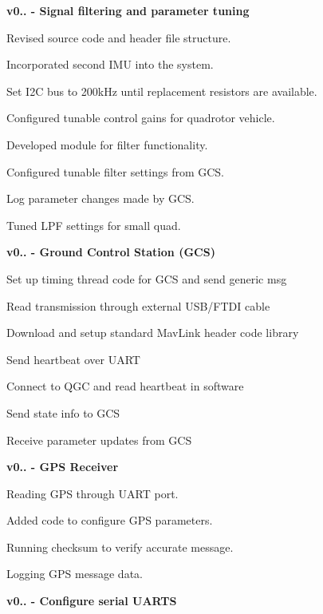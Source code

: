 \begin{DoxyItemize}
\begin{DoxyItemize}
\end{DoxyItemize}
\item {\bfseries  v0.. -\/ Signal filtering and parameter tuning } 
\begin{DoxyItemize}
\item Revised source code and header file structure.  
\item Incorporated second I\+MU into the system.  
\item Set I2C bus to 200k\+Hz until replacement resistors are available.  
\item Configured tunable control gains for quadrotor vehicle.  
\item Developed module for filter functionality.  
\item Configured tunable filter settings from G\+CS.  
\item Log parameter changes made by G\+CS.  
\item Tuned L\+PF settings for small quad.  
\end{DoxyItemize}
\item {\bfseries  v0.. -\/ Ground Control Station (G\+CS) } 
\begin{DoxyItemize}
\item Set up timing thread code for G\+CS and send generic msg  
\item Read transmission through external U\+S\+B/\+F\+T\+DI cable  
\item Download and setup standard Mav\+Link header code library  
\item Send heartbeat over U\+A\+RT  
\item Connect to Q\+GC and read heartbeat in software  
\item Send state info to G\+CS  
\item Receive parameter updates from G\+CS  
\end{DoxyItemize}
\item {\bfseries v0.. -\/ G\+PS Receiver } 
\begin{DoxyItemize}
\item Reading G\+PS through U\+A\+RT port.  
\item Added code to configure G\+PS parameters.  
\item Running checksum to verify accurate message.  
\item Logging G\+PS message data.  
\end{DoxyItemize}
\item {\bfseries  v0.. -\/ Configure serial U\+A\+R\+TS } 
\begin{DoxyItemize}

\end{DoxyItemize}
\end{DoxyItemize}
